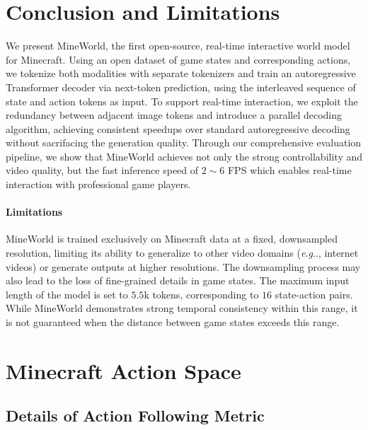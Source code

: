 \documentclass{article} %
\makeatletter
\DeclareRobustCommand\onedot{\futurelet\@let@token\@onedot}
\def\@onedot{\ifx\@let@token.\else.\null\fi\xspace}
\def\eg{\emph{e.g}\onedot} \def\Eg{\emph{E.g}\onedot}
\makeatother
\begin{document}
\section{Conclusion and Limitations}

We present MineWorld, the first open-source, real-time interactive world model for Minecraft. Using an open dataset of game states and corresponding actions, we tokenize both modalities with separate tokenizers and train an autoregressive Transformer decoder via next-token prediction, using the interleaved sequence of state and action tokens as input. To support real-time interaction, we exploit the redundancy between adjacent image tokens and introduce a parallel decoding algorithm, achieving consistent speedups over standard autoregressive decoding without sacrifacing the generation quality. Through our comprehensive evaluation pipeline, we show that MineWorld achieves not only the strong controllability and video quality, but the fast inference speed of $2\sim6$ FPS which enables real-time interaction with professional game players.

\paragraph{Limitations}
MineWorld is trained exclusively on Minecraft data at a fixed, downsampled resolution, limiting its ability to generalize to other video domains (\eg, internet videos) or generate outputs at higher resolutions. The downsampling process may also lead to the loss of fine-grained details in game states. The maximum input length of the model is set to $5.5$k tokens, corresponding to $16$ state-action pairs. While MineWorld demonstrates strong temporal consistency within this range, it is not guaranteed when the distance between game states exceeds this range. 




\newpage
\appendix

\section{Minecraft Action Space}

\subsection{Details of Action Following Metric}
\end{document}
